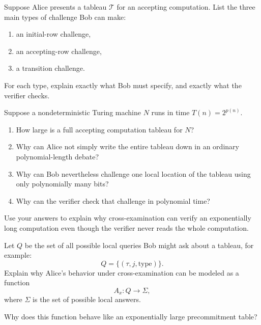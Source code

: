 \documentclass[11pt]{article}
\begin{document}
\begin{exercise}
\label{ex:designing-a-bob-challenge}
Suppose Alice presents a tableau \(\mathcal T\) for an accepting computation. List the three main types of challenge Bob can make:
\begin{enumerate}
    \item an initial-row challenge,
    \item an accepting-row challenge,
    \item a transition challenge.
\end{enumerate}
For each type, explain exactly what Bob must specify, and exactly what the verifier checks.
\end{exercise}

\begin{exercise}
\label{ex:why-this-reaches-mathsf-nexp}
Suppose a nondeterministic Turing machine \(N\) runs in time \(T(n)=2^{p(n)}\).

\begin{enumerate}
    \item How large is a full accepting computation tableau for \(N\)?
    \item Why can Alice not simply write the entire tableau down in an ordinary polynomial-length debate?
    \item Why can Bob nevertheless challenge one local location of the tableau using only polynomially many bits?
    \item Why can the verifier check that challenge in polynomial time?
\end{enumerate}

Use your answers to explain why cross-examination can verify an exponentially long computation even though the verifier never reads the whole computation.
\end{exercise}

\begin{exercise}
\label{ex:cross-examination-as-precommitment}
Let \(Q\) be the set of all possible local queries Bob might ask about a tableau, for example:
\[
Q = \{(\tau,j,\mathrm{type})\}.
\]
Explain why Alice's behavior under cross-examination can be modeled as a function
\[
A_x : Q \to \Sigma,
\]
where \(\Sigma\) is the set of possible local answers.

Why does this function behave like an exponentially large precommitment table?
\end{exercise}
\end{document}
